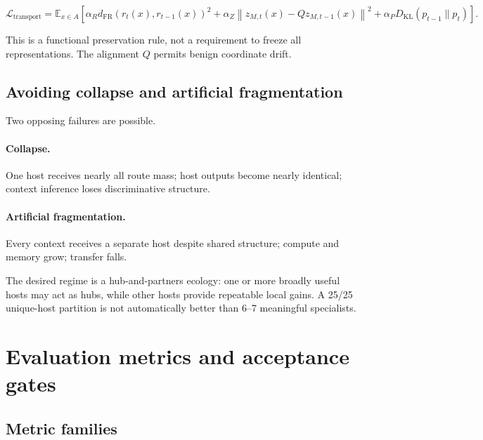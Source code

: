 \documentclass[11pt,a4paper]{article}
\newcommand{\E}{\mathbb{E}}
\newcommand{\KL}{D_{\mathrm{KL}}}
\newcommand{\loss}{\mathcal{L}}
\newcommand{\norm}[1]{\left\lVert #1 \right\rVert}
\begin{document}
\begin{equation}
\loss_{\mathrm{transport}}=
\E_{x\in A}\left[
\alpha_R d_{\mathrm{FR}}(r_t(x),r_{t-1}(x))^2
+\alpha_Z\norm{z_{M,t}(x)-Qz_{M,t-1}(x)}^2
+\alpha_P\KL(p_{t-1}\|p_t)
\right].
\end{equation}

This is a functional preservation rule, not a requirement to freeze all representations. The alignment \(Q\) permits benign coordinate drift.

\subsection{Avoiding collapse and artificial fragmentation}

Two opposing failures are possible.

\paragraph{Collapse.} One host receives nearly all route mass; host outputs become nearly identical; context inference loses discriminative structure.

\paragraph{Artificial fragmentation.} Every context receives a separate host despite shared structure; compute and memory grow; transfer falls.

The desired regime is a hub-and-partners ecology: one or more broadly useful hosts may act as hubs, while other hosts provide repeatable local gains. A 25/25 unique-host partition is not automatically better than 6--7 meaningful specialists.

\section{Evaluation metrics and acceptance gates}

\subsection{Metric families}
\end{document}
